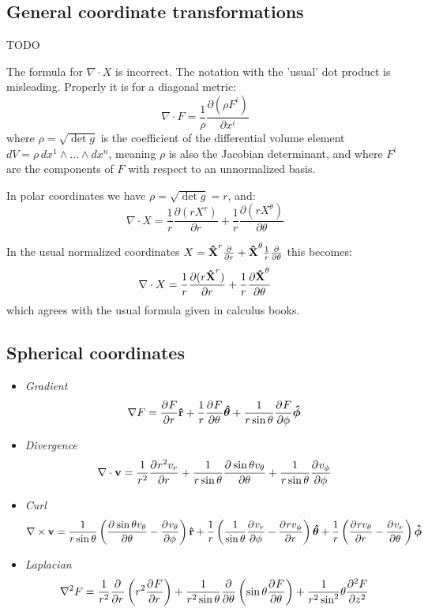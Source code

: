 \subsection{General coordinate transformations}
TODO


The formula for $\nabla\cdot X$ is incorrect. The notation with the 'usual' dot product is misleading. Properly it is for a diagonal metric:
\[\nabla\cdot F = \frac 1\rho\frac{\partial(\rho F^i)}{\partial x^i}\]
where $\rho=\sqrt{\det g}$ is the coefficient of the differential volume element $dV=\rho\, dx^1\wedge\ldots \wedge dx^n$, meaning $\rho$ is also the Jacobian determinant, and where $F^i$ are the components of $F$ with respect to an unnormalized basis.

In polar coordinates we have $\rho=\sqrt{\det g}=r$, and:
\[\nabla\cdot X = \frac 1r \frac{\partial(r X^r)}{\partial r} 
+ \frac 1r\frac{\partial(r X^\theta)}{\partial \theta}\]

In the usual normalized coordinates $X=\vhat X^{r}\frac{\partial}{\partial r} + \vhat X^{\theta}\frac 1r\frac{\partial}{\partial\theta}$ this becomes:
\[\nabla\cdot X = \frac 1r \frac{\partial(r \vhat X^{r})}{\partial r} 
+ \frac 1r\frac{\partial \vhat X^{\theta}}{\partial \theta}\]
which agrees with the usual formula given in calculus books.

\subsection{Spherical coordinates}
\begin{itemize}
\item \textit{Gradient}
\[ \grad F = \pd{F}{r}\vhat{r} + \frac{1}{r} \pd{F}{\theta}\vhat{\theta} + \frac{1}{r\sin\theta}\pd{F}{\phi}\vhat{\phi} \]
\item \textit{Divergence}
\[ \nabla\cdot \vec{v} = \frac{1}{r^2}\pd{r^2v_r}{r} + \frac{1}{r\sin\theta}\pd{\sin\theta v_\theta}{\theta} + \frac{1}{r\sin\theta}\pd{v_\phi}{\phi} \]
\item \textit{Curl}
\[ \curl \vec{v} = \frac{1}{r\sin\theta}\left(\pd{\sin\theta v_\theta}{\theta} - \pd{v_\theta}{\phi}\right)\vhat{r} + \frac{1}{r}\left(\frac{1}{\sin\theta}\pd{v_r}{\phi} - \pd{rv_\phi}{r}\right)\vhat{\theta} + \frac{1}{r}\left(\pd{rv_\theta}{r} - \pd{v_r}{\theta}\right)\vhat{\phi}  \]
\item \textit{Laplacian}
\[ \nabla^2 F = \frac{1}{r^2} \pd{}{r}\left(r^2 \pd{F}{r}\right) + \frac{1}{r^2\sin\theta} \pd{}{\theta}\left(\sin\theta \pd{F}{\theta}\right) + \frac{1}{r^2\sin^2}\theta\pd[2]{F}{z} \]
\end{itemize}
